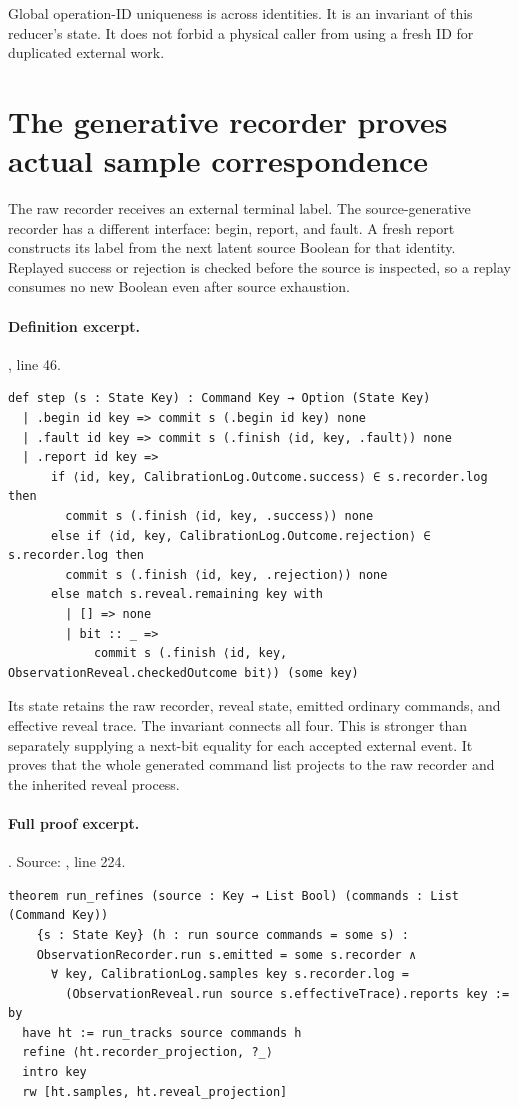 \documentclass[11pt]{article}
\begin{document}
Global operation-ID uniqueness is across identities. It is an invariant of
this reducer's state. It does not forbid a physical caller from using a fresh
ID for duplicated external work.

\section{The generative recorder proves actual sample correspondence}
\label{sec:generative}
The raw recorder receives an external terminal label. The source-generative
recorder has a different interface: begin, report, and fault. A fresh report
constructs its label from the next latent source Boolean for that identity.
Replayed success or rejection is checked before the source is inspected, so a
replay consumes no new Boolean even after source exhaustion.

\paragraph{Definition excerpt.}, line 46.
\begin{lstlisting}[style=AVOCSource]
def step (s : State Key) : Command Key → Option (State Key)
  | .begin id key => commit s (.begin id key) none
  | .fault id key => commit s (.finish ⟨id, key, .fault⟩) none
  | .report id key =>
      if ⟨id, key, CalibrationLog.Outcome.success⟩ ∈ s.recorder.log then
        commit s (.finish ⟨id, key, .success⟩) none
      else if ⟨id, key, CalibrationLog.Outcome.rejection⟩ ∈ s.recorder.log then
        commit s (.finish ⟨id, key, .rejection⟩) none
      else match s.reveal.remaining key with
        | [] => none
        | bit :: _ =>
            commit s (.finish ⟨id, key, ObservationReveal.checkedOutcome bit⟩) (some key)
\end{lstlisting}


Its state retains the raw recorder, reveal state, emitted ordinary commands,
and effective reveal trace. The  invariant connects all four.
This is stronger than separately supplying a next-bit equality for each
accepted external event. It proves that the whole generated command list
projects to the raw recorder and the inherited reveal process.

\paragraph{Full proof excerpt.}. Source: , line 224.
\begin{lstlisting}[style=AVOCSource]
theorem run_refines (source : Key → List Bool) (commands : List (Command Key))
    {s : State Key} (h : run source commands = some s) :
    ObservationRecorder.run s.emitted = some s.recorder ∧
      ∀ key, CalibrationLog.samples key s.recorder.log =
        (ObservationReveal.run source s.effectiveTrace).reports key := by
  have ht := run_tracks source commands h
  refine ⟨ht.recorder_projection, ?_⟩
  intro key
  rw [ht.samples, ht.reveal_projection]
\end{lstlisting}
\end{document}
